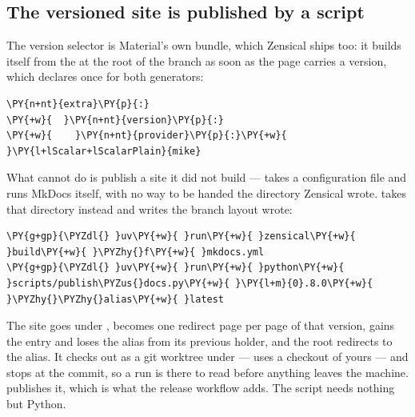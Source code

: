 \documentclass[a4paper,twoside]{article}
\begin{document}
\subsection{The versioned site is published by a script}
The version selector is Material's own bundle, which Zensical ships too: it
builds itself from the  at the root of the  branch as
soon as the page carries a version, which  declares once for both
generators:
\begin{tscode}[lang=yaml, engine=pygments]
\begin{Verbatim}[commandchars=\\\{\},breaklines, breakanywhere, commandchars=\\\{\}]
\PY{n+nt}{extra}\PY{p}{:}
\PY{+w}{  }\PY{n+nt}{version}\PY{p}{:}
\PY{+w}{    }\PY{n+nt}{provider}\PY{p}{:}\PY{+w}{ }\PY{l+lScalar+lScalarPlain}{mike}
\end{Verbatim}
\end{tscode}
What  cannot do is publish a site it did not build ---  takes
a configuration file and runs MkDocs itself, with no way to be handed the
directory Zensical wrote.  takes that directory
instead and writes the branch layout  wrote:
\begin{tscode}[lang=console, engine=pygments]
\begin{Verbatim}[commandchars=\\\{\},breaklines, breakanywhere, commandchars=\\\{\}]
\PY{g+gp}{\PYZdl{} }uv\PY{+w}{ }run\PY{+w}{ }zensical\PY{+w}{ }build\PY{+w}{ }\PYZhy{}f\PY{+w}{ }mkdocs.yml
\PY{g+gp}{\PYZdl{} }uv\PY{+w}{ }run\PY{+w}{ }python\PY{+w}{ }scripts/publish\PYZus{}docs.py\PY{+w}{ }\PY{l+m}{0}.8.0\PY{+w}{ }\PYZhy{}\PYZhy{}alias\PY{+w}{ }latest
\end{Verbatim}
\end{tscode}
The site goes under ,  becomes one redirect page per page of
that version,  gains the entry and loses the alias from its
previous holder, and the root  redirects to the alias. It checks
 out as a git worktree under  ---  uses a checkout of yours --- and stops at the commit, so a run is there to
read before anything leaves the machine.  publishes it, which is what
the release workflow adds. The script needs nothing but Python.
\end{document}
